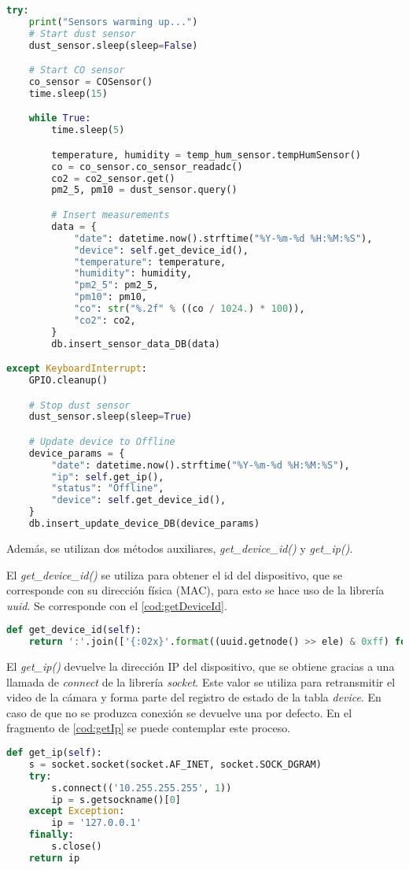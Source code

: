 \begin{lstlisting}[language=Python, label=cod:metodoPrincipal, caption=Método start del programa principal]
try:
    print("Sensors warming up...")
    # Start dust sensor
    dust_sensor.sleep(sleep=False)

    # Start CO sensor
    co_sensor = COSensor()
    time.sleep(15)

    while True:
        time.sleep(5)

        temperature, humidity = temp_hum_sensor.tempHumSensor()
        co = co_sensor.co_sensor_readadc()
        co2 = co2_sensor.get()
        pm2_5, pm10 = dust_sensor.query()

        # Insert measurements
        data = {
            "date": datetime.now().strftime("%Y-%m-%d %H:%M:%S"),
            "device": self.get_device_id(),
            "temperature": temperature,
            "humidity": humidity,
            "pm2_5": pm2_5,
            "pm10": pm10,
            "co": str("%.2f" % ((co / 1024.) * 100)),
            "co2": co2,
        }
        db.insert_sensor_data_DB(data)

except KeyboardInterrupt:
    GPIO.cleanup()

    # Stop dust sensor
    dust_sensor.sleep(sleep=True)

    # Update device to Offline
    device_params = {
        "date": datetime.now().strftime("%Y-%m-%d %H:%M:%S"),
        "ip": self.get_ip(),
        "status": "Offline",
        "device": self.get_device_id(),
    }
    db.insert_update_device_DB(device_params)
\end{lstlisting}
\pagebreak

Además, se utilizan dos métodos auxiliares, \textit{get\_device\_id()} y \textit{get\_ip()}.  

El \textit{get\_device\_id()} se utiliza para obtener el id del dispositivo, que se corresponde con su dirección física (MAC), para esto se hace uso de la librería \textit{uuid}. Se corresponde con el \autoref{cod:getDeviceId}.
\begin{lstlisting}[language=Python, label=cod:getDeviceId, caption=Metodo get\_device\_id()]
def get_device_id(self):
    return ':'.join(['{:02x}'.format((uuid.getnode() >> ele) & 0xff) for ele in range(0, 8 * 6, 8)][::-1])
\end{lstlisting}

El \textit{get\_ip()} devuelve la dirección IP del dispositivo, que se obtiene gracias a una llamada de \textit{connect} de la librería \textit{socket}. Este valor se utiliza para retransmitir el video de la cámara y forma parte del registro de estado de la tabla \textit{device}. En caso de que no se produzca conexión se devuelve una por defecto. En el fragmento de \autoref{cod:getIp} se puede contemplar este proceso.
\begin{lstlisting}[language=Python, label=cod:getIp, caption=Metodo get\_ip()]
def get_ip(self):
    s = socket.socket(socket.AF_INET, socket.SOCK_DGRAM)
    try:
        s.connect(('10.255.255.255', 1))
        ip = s.getsockname()[0]
    except Exception:
        ip = '127.0.0.1'
    finally:
        s.close()
    return ip
\end{lstlisting}